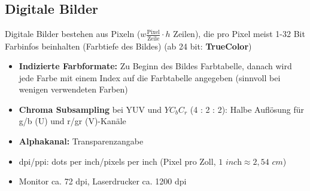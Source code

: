\documentclass[12pt,landscape]{article}
\begin{document}
\begin{multicols}{3}
\begin{itemize}
\end{itemize}
\subsection{Digitale Bilder}
Digitale Bilder bestehen aus Pixeln ($w \frac{\text{Pixel}}{\text{Zeile}} \cdot h \text{ Zeilen}$), die pro Pixel meist 1-32 Bit Farbinfos beinhalten (Farbtiefe des Bildes) (ab 24 bit: \textbf{TrueColor})
\begin{itemize}
\item \textbf{Indizierte Farbformate:} Zu Beginn des Bildes Farbtabelle, danach wird jede Farbe mit einem Index auf die Farbtabelle angegeben (sinnvoll bei wenigen verwendeten Farben)
\item \textbf{Chroma Subsampling} bei YUV und $YC_bC_r$ (4 : 2 : 2): Halbe Auflösung für g/b (U) und r/gr (V)-Kanäle
\item \textbf{Alphakanal:} Transparenzangabe
\item dpi/ppi: dots per inch/pixels per inch (Pixel pro Zoll, $1 \textit{ inch} \approx 2,54\textit{ cm}$)
\item Monitor ca. 72 dpi, Laserdrucker ca. 1200 dpi
\end{itemize}

\end{multicols}
\end{document}
